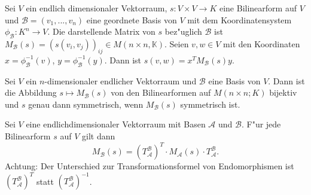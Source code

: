 \documentclass[8pt, a4paper, twocolumn, landscape]{article}
\newcommand{\comment}[1]{}
\begin{document}
\begin{remark} Sei $V$ ein endlich dimensionaler Vektorraum, $s : V \times V \rightarrow K$ eine Bilinearform auf $V$ und $\mathcal{B} = (v_1, ..., v_n)$ eine geordnete Basis von $V$ mit dem Koordinatensystem  $\phi_\mathcal{B} : K^n \rightarrow V$.
Die darstellende Matrix von $s$ bez"uglich $\mathcal{B}$ ist $M_\mathcal{B}(s) = \left(s(v_i, v_j) \right)_{ij} \in M(n \times n, \mathbb{K})$.
Seien $v, w \in V$  mit den Koordinaten $x = \phi^{-1}_\mathcal{B}(v)$, $y = \phi^{-1}_\mathcal{B}(y)$. Dann ist
$
s(v, w)= x^T M_\mathcal{B}(s) y.
$
\comment{\left(x_{1}, \ldots, x_{n}\right)\left(\begin{array}{ccc}a_{11} & \cdots & a_{1 n} \\ \vdots & & \vdots \\ a_{n 1} & \cdots & a_{n n}\end{array}\right)\left(\begin{array}{c}y_{1} \\ \vdots \\ y_{n}\end{array}\right).}
\end{remark}

\begin{theorem}
Sei $V$ ein $n$-dimensionaler endlicher Vektorraum und $\mathcal{B}$ eine Basis von $V$. Dann ist  die Abbildung
$
s \mapsto M_{\mathcal{B}}(s)
$
von den Bilinearformen auf $M(n \times n; K)$ bijektiv und $s$ genau dann symmetrisch, wenn $M_{\mathcal{B}}(s)$ symmetrisch ist. 
\end{theorem}



\comment{
\begin{lemma}
Seien $A, B \in M(n \times n; K)$ mit 
\begin{equation*}
x_TAy = x_TBy = 
\end{equation*}
f\uee r alle $x, y \in K^n$. Dann ist $A = B$. 
\end{lemma}
}

\begin{theorem}
Sei $V$ eine endlichdimensionaler Vektorraum mit Basen $\mathcal{A}$ und $ \mathcal{B}$. F"ur jede Bilinearform $s$ auf $V$ gilt dann
\begin{equation*}
M_\mathcal{B}(s) =( T^\mathcal{B}_\mathcal{A})^T \cdot M_\mathcal{A}(s) \cdot T^\mathcal{B}_\mathcal{A}.
\end{equation*}
Achtung: Der Unterschied zur Transformationsformel von Endomorphismen ist $( T^\mathcal{B}_\mathcal{A})^T$ statt $( T^\mathcal{B}_\mathcal{A})^{-1}$.
\end{theorem}
\end{document}
